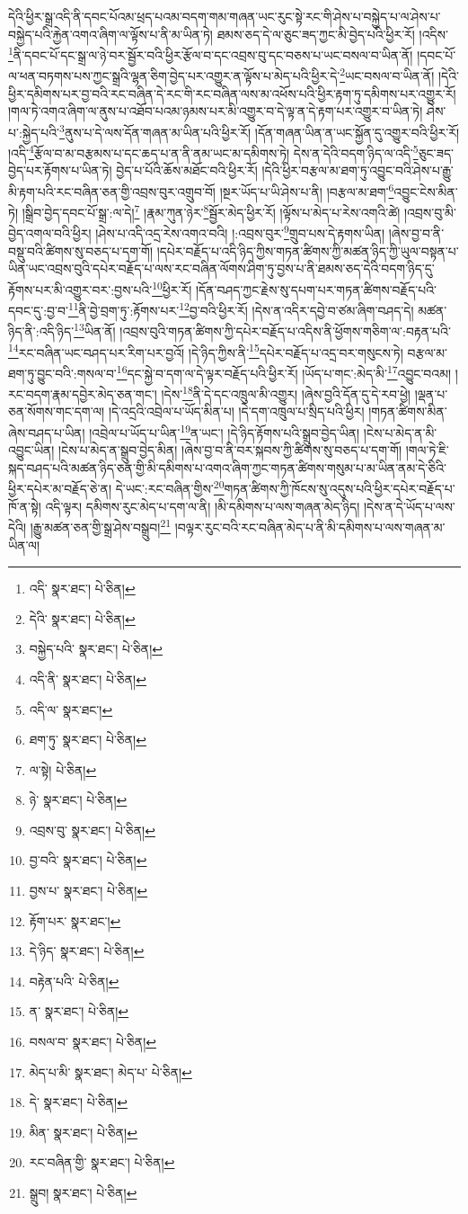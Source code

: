 དེའི་ཕྱིར་སྒྲ་འདི་ནི་དབང་པོའམ་ཕྲད་པའམ་བདག་གམ་གཞན་ཡང་རུང་སྟེ་རང་གི་ཤེས་པ་བསྐྱེད་པ་ལ་ཤེས་པ་བསྐྱེད་པའི་རྐྱེན་འགའ་ཞིག་ལ་ལྟོས་པ་ནི་མ་ཡིན་ཏེ། ཐམས་ཅད་དེ་ལ་ཅུང་ཟད་ཀྱང་མི་བྱེད་པའི་ཕྱིར་རོ། །འདིས་\footnote{འདི་  སྣར་ཐང་།  པེ་ཅིན། }ནི་དབང་པོ་དང་སྒྲ་ལ་ཉེ་བར་སྦྱོར་བའི་ཕྱིར་རྩོལ་བ་དང་འབྲས་བུ་དང་བཅས་པ་ཡང་བསལ་བ་ཡིན་ནོ། །དབང་པོ་ལ་ཕན་བཏགས་པས་ཀྱང་སྒྲའི་ལྷན་ཅིག་བྱེད་པར་འགྱུར་ན་ལྟོས་པ་མེད་པའི་ཕྱིར་དེ་\footnote{དེའི་  སྣར་ཐང་།  པེ་ཅིན། }ཡང་བསལ་བ་ཡིན་ནོ། །དེའི་ཕྱིར་དམིགས་པར་བྱ་བའི་རང་བཞིན་དེ་རང་གི་རང་བཞིན་ལས་མ་འཕོས་པའི་ཕྱིར་རྟག་ཏུ་དམིགས་པར་འགྱུར་རོ། །གལ་ཏེ་འགའ་ཞིག་ལ་ནུས་པ་འཐོབ་པའམ་ཉམས་པར་མི་འགྱུར་བ་དེ་ལྟ་ན་དེ་རྟག་པར་འགྱུར་བ་ཡིན་ཏེ། ཤེས་པ་:སྐྱེད་པའི་\footnote{བསྐྱེད་པའི་  སྣར་ཐང་།  པེ་ཅིན། }ནུས་པ་དེ་ལས་དོན་གཞན་མ་ཡིན་པའི་ཕྱིར་རོ། །དོན་གཞན་ཡིན་ན་ཡང་སྐྱོན་དུ་འགྱུར་བའི་ཕྱིར་རོ། །འདི་\footnote{འདི་ནི་  སྣར་ཐང་།  པེ་ཅིན། }རྩོལ་བ་མ་བརྩམས་པ་དང་ཆད་པ་ན་ནི་ནམ་ཡང་མ་དམིགས་ཏེ། དེས་ན་དེའི་བདག་ཉིད་ལ་འདི་\footnote{འདི་ལ་  སྣར་ཐང་། }ཅུང་ཟད་བྱེད་པར་རྟོགས་པ་ཡིན་ཏེ། བྱེད་པ་པོའི་ཆོས་མཐོང་བའི་ཕྱིར་རོ། །དེའི་ཕྱིར་བརྩལ་མ་ཐག་ཏུ་འབྱུང་བའི་ཤེས་པ་རྒྱུ་མི་རྟག་པའི་རང་བཞིན་ཅན་གྱི་འབྲས་བུར་འགྲུབ་བོ། །སྔར་ཡོད་པ་ཡི་ཤེས་པ་ནི། །བརྩལ་མ་ཐག་\footnote{ཐག་ཏུ་  སྣར་ཐང་།  པེ་ཅིན། }འབྱུང་ངེས་མིན་ཏེ། །སྒྲིབ་བྱེད་དབང་པོ་སྒྲ་:ལ་དེ།\footnote{ལ་སྟེ།  པེ་ཅིན། } །རྣམ་ཀུན་ཉེར་\footnote{ཉེ་  སྣར་ཐང་།  པེ་ཅིན། }སྦྱོར་མེད་ཕྱིར་རོ། །ལྟོས་པ་མེད་པ་རེས་འགའི་ཚེ། །འབྲས་བུ་མི་བྱེད་འགལ་བའི་ཕྱིར། །ཤེས་པ་འདི་འདྲ་རེས་འགའ་བའི། །:འབྲས་བུར་\footnote{འབྲས་བུ་  སྣར་ཐང་།  པེ་ཅིན། }གྲུབ་པས་དེ་རྟགས་ཡིན། །ཞེས་བྱ་བ་ནི་བསྡུ་བའི་ཚིགས་སུ་བཅད་པ་དག་གོ། །དཔེར་བརྗོད་པ་འདི་ཉིད་ཀྱིས་གཏན་ཚིགས་ཀྱི་མཚན་ཉིད་ཀྱི་ཡུལ་བསྟན་པ་ཡིན་ཡང་འབྲས་བུའི་དཔེར་བརྗོད་པ་ལས་རང་བཞིན་ལོགས་ཤིག་ཏུ་བྱས་པ་ནི་ཐམས་ཅད་དེའི་བདག་ཉིད་དུ་རྟོགས་པར་མི་འགྱུར་བར་:བྱས་པའི་\footnote{བྱ་བའི་  སྣར་ཐང་།  པེ་ཅིན། }ཕྱིར་རོ། །དོན་བཤད་ཀྱང་རྗེས་སུ་དཔག་པར་གཏན་ཚིགས་བརྗོད་པའི་དབང་དུ་:བྱ་བ་\footnote{བྱས་པ་  སྣར་ཐང་།  པེ་ཅིན། }ནི་བྱེ་བྲག་ཏུ་:རྟོགས་པར་\footnote{རྟོག་པར་  སྣར་ཐང་། }བྱ་བའི་ཕྱིར་རོ། །དེས་ན་འདིར་དབྱེ་བ་ཙམ་ཞིག་བཤད་དེ། མཚན་ཉིད་ནི་:འདི་ཉིད་\footnote{དེ་ཉིད་  སྣར་ཐང་།  པེ་ཅིན། }ཡིན་ནོ། །འབྲས་བུའི་གཏན་ཚིགས་ཀྱི་དཔེར་བརྗོད་པ་འདིས་ནི་ཕྱོགས་གཅིག་ལ་:བརྟན་པའི་\footnote{བརྟེན་པའི་  པེ་ཅིན། }རང་བཞིན་ཡང་བཤད་པར་རིག་པར་བྱའོ། །དེ་ཉིད་ཀྱིས་ནི་\footnote{ན་  སྣར་ཐང་།  པེ་ཅིན། }དཔེར་བརྗོད་པ་འདྲ་བར་གསུངས་ཏེ། བརྩལ་མ་ཐག་ཏུ་བྱུང་བའི་:གསལ་བ་\footnote{བསལ་བ་  སྣར་ཐང་།  པེ་ཅིན། }དང་སྐྱེ་བ་དག་ལ་དེ་ལྟར་བརྗོད་པའི་ཕྱིར་རོ། །ཡོད་པ་གང་:མེད་མི་\footnote{མེད་པ་མི་  སྣར་ཐང་། མེད་པ་  པེ་ཅིན། }འབྱུང་བའམ། །རང་བདག་རྣམ་དབྱེར་མེད་ཅན་གང་། །དེས་\footnote{དེ་  སྣར་ཐང་།  པེ་ཅིན། }ནི་དེ་དང་འཁྲུལ་མི་འགྱུར། །ཞེས་བྱའི་དོན་དུ་དེ་རབ་ཕྱེ། །ལྡན་པ་ཅན་སོགས་གང་དག་ལ། །དེ་འདྲའི་འབྲེལ་པ་ཡོད་མིན་པ། །དེ་དག་འཁྲུལ་པ་སྲིད་པའི་ཕྱིར། །གཏན་ཚིགས་མིན་ཞེས་བཤད་པ་ཡིན། །འབྲེལ་པ་ཡོད་པ་ཡིན་\footnote{མིན་  སྣར་ཐང་།  པེ་ཅིན། }ན་ཡང་། །དེ་ཉིད་རྟོགས་པའི་སྒྲུབ་བྱེད་ཡིན། །ངེས་པ་མེད་ན་མི་འབྱུང་ཡིན། །ངེས་པ་མེད་ན་སྒྲུབ་བྱེད་མིན། །ཞེས་བྱ་བ་ནི་བར་སྐབས་ཀྱི་ཚིགས་སུ་བཅད་པ་དག་གོ། །གལ་ཏེ་ཇི་སྐད་བཤད་པའི་མཚན་ཉིད་ཅན་གྱི་མི་དམིགས་པ་འགའ་ཞིག་ཀྱང་གཏན་ཚིགས་གསུམ་པ་མ་ཡིན་ནམ་དེ་ཅིའི་ཕྱིར་དཔེར་མ་བརྗོད་ཅེ་ན། དེ་ཡང་:རང་བཞིན་གྱིས་\footnote{རང་བཞིན་གྱི་  སྣར་ཐང་།  པེ་ཅིན། }གཏན་ཚིགས་ཀྱི་ཁོངས་སུ་འདུས་པའི་ཕྱིར་དཔེར་བརྗོད་པ་ཁོ་ན་སྟེ། འདི་ལྟར། དམིགས་རུང་མེད་པ་དག་ལ་ནི། །མི་དམིགས་པ་ལས་གཞན་མེད་ཉིད། །དེས་ན་དེ་ཡོད་པ་ལས་དེའི། །རྒྱུ་མཚན་ཅན་གྱི་སྒྲ་ཤེས་བསྒྲུབ།\footnote{སྒྲུབ།  སྣར་ཐང་།  པེ་ཅིན། } །བལྟར་རུང་བའི་རང་བཞིན་མེད་པ་ནི་མི་དམིགས་པ་ལས་གཞན་མ་ཡིན་ལ། 